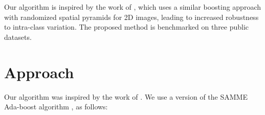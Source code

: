 \documentclass[10pt,twocolumn,letterpaper]{article}
\begin{document}
	Our algorithm is inspired by the work of \cite{Jiang12}, which uses a
	similar boosting approach with randomized spatial pyramids for 2D images, 
	leading to increased robustness to intra-class variation. The proposed
	method is benchmarked on three public datasets.


\section{Approach}
	Our algorithm was inspired by the work of \cite{Jiang12}. We use a
	version of the SAMME Ada-boost algorithm \cite{Zhu06}, as follows:
\end{document}

